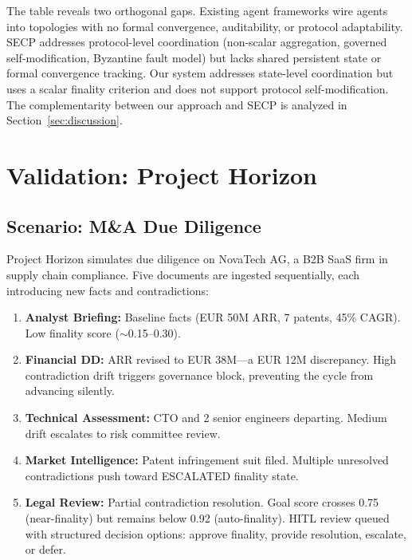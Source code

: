 \documentclass[11pt]{article}
\begin{document}
The table reveals two orthogonal gaps. Existing agent frameworks wire agents into topologies with no formal convergence, auditability, or protocol adaptability. SECP addresses protocol-level coordination (non-scalar aggregation, governed self-modification, Byzantine fault model) but lacks shared persistent state or formal convergence tracking. Our system addresses state-level coordination but uses a scalar finality criterion and does not support protocol self-modification. The complementarity between our approach and SECP is analyzed in Section~\ref{sec:discussion}.

\section{Validation: Project Horizon}

\subsection{Scenario: M\&A Due Diligence}

Project Horizon simulates due diligence on NovaTech AG, a B2B SaaS firm in supply chain compliance. Five documents are ingested sequentially, each introducing new facts and contradictions:

\begin{enumerate}
  \item \textbf{Analyst Briefing:} Baseline facts (EUR 50M ARR, 7 patents, 45\% CAGR). Low finality score ($\sim$0.15--0.30).

  \item \textbf{Financial DD:} ARR revised to EUR 38M---a EUR 12M discrepancy. High contradiction drift triggers governance block, preventing the cycle from advancing silently.

  \item \textbf{Technical Assessment:} CTO and 2 senior engineers departing. Medium drift escalates to risk committee review.

  \item \textbf{Market Intelligence:} Patent infringement suit filed. Multiple unresolved contradictions push toward ESCALATED finality state.

  \item \textbf{Legal Review:} Partial contradiction resolution. Goal score crosses 0.75 (near-finality) but remains below 0.92 (auto-finality). HITL review queued with structured decision options: approve finality, provide resolution, escalate, or defer.
\end{enumerate}
\end{document}
